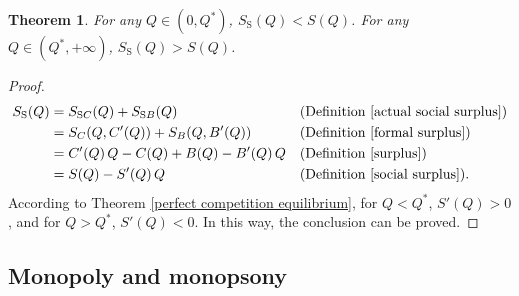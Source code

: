 \documentclass{article}
\newtheorem{theorem}{Theorem}[subsection]
\begin{document}
\begin{theorem}
\label{difference in social and actual social}
For any $Q\in\left(0,Q^*\right)$, $S_\mathrm S\!\left(Q\right)<S\!\left(Q\right)$.
For any $Q\in\left(Q^*,+\infty\right)$, $S_\mathrm S\!\left(Q\right)>S\!\left(Q\right)$.
\end{theorem}
\begin{proof}
\begin{align*}
S_\mathrm S\!\left(Q\right)&=S_{\mathrm SC}\!\left(Q\right)+S_{\mathrm SB}\!\left(Q\right)&&\text{(Definition \ref{actual social surplus})}\\
&=S_C\!\left(Q,C'\!\left(Q\right)\right)+S_B\!\left(Q,B'\!\left(Q\right)\right)&&\text{(Definition \ref{formal surplus})}\\
&=C'\!\left(Q\right)Q-C\!\left(Q\right)+B\!\left(Q\right)-B'\!\left(Q\right)Q&&\text{(Definition \ref{surplus})}\\
&=S\!\left(Q\right)-S'\!\left(Q\right)Q&&\text{(Definition \ref{social surplus})}.
\end{align*}
According to Theorem \ref{perfect competition equilibrium},
for $Q<Q^*$, $S'\!\left(Q\right)>0$, and for $Q>Q^*$, $S'\!\left(Q\right)<0$.
In this way, the conclusion can be proved.
\end{proof}

\subsection{Monopoly and monopsony}
\end{document}
